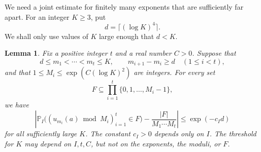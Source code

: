 \documentclass[11pt,reqno]{amsart}
\numberwithin{equation}{section}
\newtheorem{lemma}[theorem]{Lemma}
\begin{document}
We need a joint estimate for finitely many exponents that are sufficiently far apart. For an integer $K\ge3$, put
\[
 d=\lceil(\log K)^4\rceil.
\]
We shall only use values of $K$ large enough that $d<K$.

\begin{lemma}\label{lem-prime-joint-residues}
Fix a positive integer $t$ and a real number $C>0$. Suppose that
\begin{equation}\label{eq-prime-separated-indices}
 d\le m_1<\cdots<m_t\le K,
 \qquad m_{i+1}-m_i\ge d\quad(1\le i<t),
\end{equation}
and that $1\le M_i\le\exp(C(\log K)^2)$ are integers. For every set
\[
 F\subseteq\prod_{i=1}^t\{0,1,\ldots,M_i-1\},
\]
we have
\begin{equation}\label{eq-prime-joint-residue-error}
 \left|
 \mathbb P_I\bigl((u_{m_i}(a)\bmod M_i)_{i=1}^t\in F\bigr)
 -\frac{|F|}{M_1\cdots M_t}
 \right|
 \le \exp(-c_I d)
\end{equation}
for all sufficiently large $K$. The constant $c_I>0$ depends only on $I$. The threshold for $K$ may depend on $I,t,C$, but not on the exponents, the moduli, or $F$.
\end{lemma}
\end{document}
